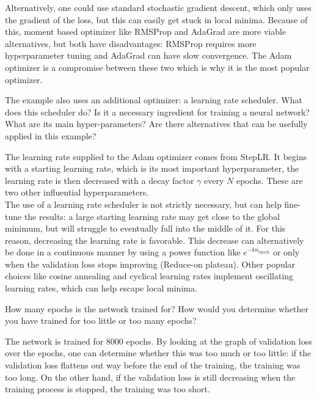 \documentclass[12pt, a4paper]{report}
\begin{document}
Alternatively, one could use standard stochastic gradient descent, which only uses the gradient of the loss, but this can easily get stuck in local minima. Because of this, moment based optimizer like RMSProp and AdaGrad are more viable alternatives, but both have disadvantages: RMSProp requires more hyperparameter tuning and AdaGrad can have slow convergence. The Adam optimizer is a compromise between these two which is why it is the most popular optimizer.\\

\begin{tcolorbox}[title=Methods Question 7,sharp corners, colframe=black, colback=white]
    The example also uses an additional optimizer: a learning rate scheduler. What does this scheduler do? Is it a necessary ingredient for training a neural network? What are its main hyper-parameters? Are there alternatives that can be usefully applied in this example?
\end{tcolorbox}
The learning rate supplied to the Adam optimizer comes from StepLR. It begins with a starting learning rate, which is its most important hyperparameter, the learning rate is then decreased with a decay factor $\gamma$ every $N$ epochs. These are two other influential hyperparameters.\\
The use of a learning rate scheduler is not strictly necessary, but can help fine-tune the results: a large starting learning rate may get close to the global minimum, but will struggle to eventually fall into the middle of it. For this reason, decreasing the learning rate is favorable. This decrease can alternatively be done in a continuous manner by using a power function like $e^{-kn_\text{epoch}}$ or only when the validation loss stops improving (Reduce-on plateau). Other popular choices like cosine annealing and cyclical learning rates implement oscillating learning rates, which can help escape local minima. \\

\begin{tcolorbox}[title=Methods Question 8,sharp corners, colframe=black, colback=white]
    How many epochs is the network trained for? How would you determine whether you have trained for too little or too many epochs?
\end{tcolorbox}
The network is trained for 8000 epochs. By looking at the graph of validation loss over the epochs, one can determine whether this was too much or too little: if the validation loss flattens out way before the end of the training, the training was too long. On the other hand, if the validation loss is still decreasing when the training process is stopped, the training was too short.\\
\end{document}
